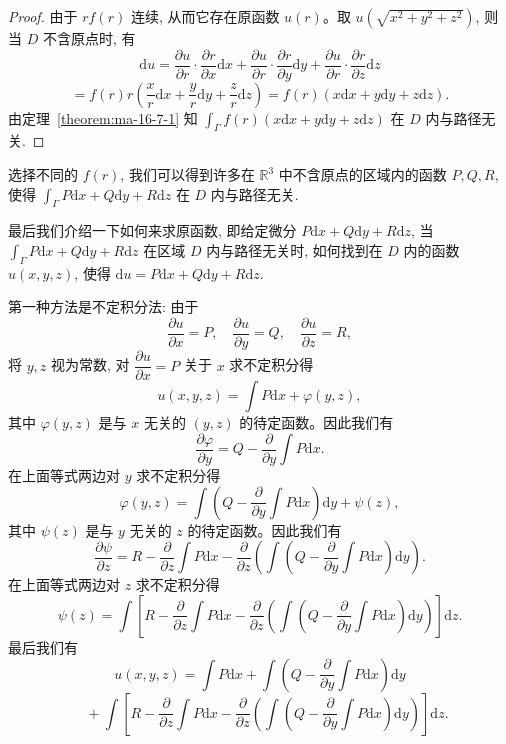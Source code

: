 \begin{proof}
由于 $rf(r)$ 连续, 从而它存在原函数 $u(r)$。取 $u(\sqrt{x^2+y^2+z^2})$, 则当 $D$ 不含原点时, 有
\[
  \mathrm du
  =\frac{\partial u}{\partial r}\cdot\frac{\partial r}{\partial x}\mathrm dx
  +\frac{\partial u}{\partial r}\cdot\frac{\partial r}{\partial y}\mathrm dy
  +\frac{\partial u}{\partial r}\cdot\frac{\partial r}{\partial z}\mathrm dz
\]
\[
  =f(r)r\left(\frac{x}{r}\mathrm dx+\frac{y}{r}\mathrm dy+\frac{z}{r}\mathrm dz\right)
  =f(r)(x\mathrm dx+y\mathrm dy+z\mathrm dz).
\]
由定理~\ref{theorem:ma-16-7-1} 知 $\int_\Gamma f(r)(x\mathrm dx+y\mathrm dy+z\mathrm dz)$ 在 $D$ 内与路径无关.
\end{proof}


\begin{remark}\label{remark:ma-16-source-76}
选择不同的 $f(r)$, 我们可以得到许多在 $\mathbb R^3$ 中不含原点的区域内的函数 $P,Q,R$, 使得 $\int_\Gamma P\mathrm dx+Q\mathrm dy+R\mathrm dz$ 在 $D$ 内与路径无关.
\end{remark}

最后我们介绍一下如何来求原函数, 即给定微分 $P\mathrm dx+Q\mathrm dy+R\mathrm dz$, 当 $\int_\Gamma P\mathrm dx+Q\mathrm dy+R\mathrm dz$ 在区域 $D$ 内与路径无关时, 如何找到在 $D$ 内的函数 $u(x,y,z)$, 使得 $\mathrm du=P\mathrm dx+Q\mathrm dy+R\mathrm dz$.

第一种方法是不定积分法: 由于
\[
  \frac{\partial u}{\partial x}=P,\quad
  \frac{\partial u}{\partial y}=Q,\quad
  \frac{\partial u}{\partial z}=R,
\]
将 $y,z$ 视为常数, 对 $\dfrac{\partial u}{\partial x}=P$ 关于 $x$ 求不定积分得
\[
  u(x,y,z)=\int P\mathrm dx+\varphi(y,z),
\]
其中 $\varphi(y,z)$ 是与 $x$ 无关的 $(y,z)$ 的待定函数。因此我们有
\[
  \frac{\partial\varphi}{\partial y}
  =Q-\frac{\partial}{\partial y}\int P\mathrm dx.
\]
在上面等式两边对 $y$ 求不定积分得
\[
  \varphi(y,z)=\int\left(Q-\frac{\partial}{\partial y}\int P\mathrm dx\right)\mathrm dy+\psi(z),
\]
其中 $\psi(z)$ 是与 $y$ 无关的 $z$ 的待定函数。因此我们有
\[
  \frac{\partial\psi}{\partial z}
  =
  R-\frac{\partial}{\partial z}\int P\mathrm dx
  -\frac{\partial}{\partial z}
  \left(\int\left(Q-\frac{\partial}{\partial y}\int P\mathrm dx\right)\mathrm dy\right).
\]
在上面等式两边对 $z$ 求不定积分得
\[
  \psi(z)=\int\left[
  R-\frac{\partial}{\partial z}\int P\mathrm dx
  -\frac{\partial}{\partial z}
  \left(\int\left(Q-\frac{\partial}{\partial y}\int P\mathrm dx\right)\mathrm dy\right)
  \right]\mathrm dz.
\]
最后我们有
\[
  u(x,y,z)=\int P\mathrm dx
  +\int\left(Q-\frac{\partial}{\partial y}\int P\mathrm dx\right)\mathrm dy
\]
\[
  \quad+\int\left[
  R-\frac{\partial}{\partial z}\int P\mathrm dx
  -\frac{\partial}{\partial z}
  \left(\int\left(Q-\frac{\partial}{\partial y}\int P\mathrm dx\right)\mathrm dy\right)
  \right]\mathrm dz.
\]

